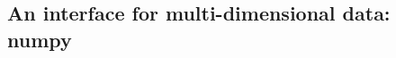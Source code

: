 \documentclass[thesis]{subfiles}
\begin{document}


%
%


\subsection{An interface for multi-dimensional data: numpy}

\end{document}

